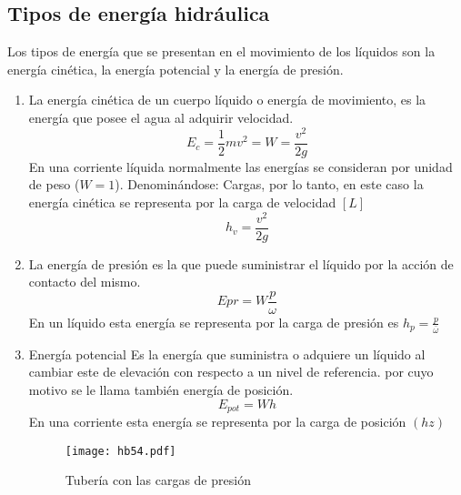\subsection{Tipos de energía hidráulica}
Los tipos de energía que se presentan en el movimiento de los líquidos son la energía cinética, la energía potencial y la energía de presión.
\begin{enumerate}
    \item La energía cinética de un cuerpo líquido o energía de movimiento, es la energía que posee el agua al adquirir velocidad.
    \begin{equation}
        E_c = \frac{1}{2}mv^2 = W = \frac{v^2}{2g}
    \end{equation}
    En una corriente líquida normalmente las energías se consideran por unidad de peso ($W=1$). Denominándose: Cargas, por lo tanto, en este
    caso la energía cinética se representa por la carga de velocidad $[L]$
    \begin{equation}
        h_v = \frac{v^2}{2g}
    \end{equation}
    \item La energía de presión es la que puede suministrar
    el líquido por la acción de contacto del mismo. 
    \begin{equation}
        Epr= W \frac{p}{\omega}
    \end{equation}
    En un líquido esta energía se representa por
    la carga de presión es $h_p=\frac{p}{\bar{\omega}}$
    \item Energía potencial Es la energía que suministra
    o adquiere un líquido al cambiar este de
    elevación con respecto a un nivel de referencia. por cuyo motivo se le llama también energía de posición.
    \begin{equation}
        E_{pot} = Wh
    \end{equation}
    En una corriente esta energía se representa por la carga de posición $(hz)$    
    \begin{figure}[h!]
    \centering
      \texttt{[image: hb54.pdf]}
      \caption{Tubería con las cargas de presión}
      \label{hb54}
    \end{figure}
\end{enumerate}

